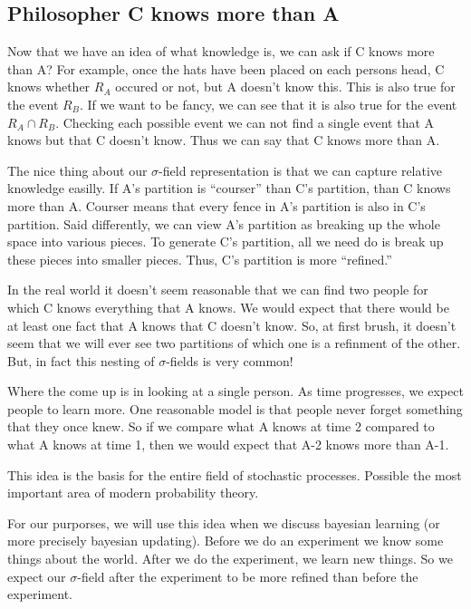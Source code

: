 \documentclass[14pt]{extarticle}
\begin{document}
\subsection{Philosopher C knows more than A}

Now that we have an idea of what knowledge is, we can ask if C knows
more than A?  For example, once the hats have been placed on each
persons head, C knows whether $R_A$ occured or not, but A doesn't know
this.  This is also true for the event $R_B$.  If we want to be fancy,
we can see that it is also true for the event $R_A \cap R_B$.
Checking each possible event we can not find a single event that A
knows but that C doesn't know.  Thus we can say that C knows more than
A. 

The nice thing about our $\sigma$-field representation is that we can
capture relative knowledge easilly.  If A's partition is ``courser'' than
C's partition, than C knows more than A.  Courser means that every
fence in A's partition is also in C's partition.  Said differently, we
can view A's partition as breaking up the whole space into various
pieces.  To generate C's partition, all we need do is break up these
pieces into smaller pieces.  Thus, C's partition is more ``refined.'' 

In the real world it doesn't seem reasonable that we can find two
people for which C knows everything that A knows.  We would expect
that there would be at least one fact that A knows that C doesn't
know.  So, at first brush, it doesn't seem that we will ever see two
partitions of which one is a refinment of the other.  But, in fact
this nesting of $\sigma$-fields is very common!

Where the come up is in looking at a single person.  As time
progresses, we expect people to learn more.  One reasonable model is
that people never forget something that they once knew.  So if we
compare what A knows at time 2 compared to what A knows at time 1,
then we would expect that A-2 knows more than A-1.

This idea is the basis for the entire field of stochastic processes.
Possible the most important area of modern probability theory.  

For our purporses, we will use this idea when we discuss bayesian
learning (or more precisely bayesian updating).  Before we do an
experiment we know some things about the world.  After we do the
experiment, we learn new things.  So we expect our $\sigma$-field
after the experiment to be more refined than before the experiment. 
\end{document}
